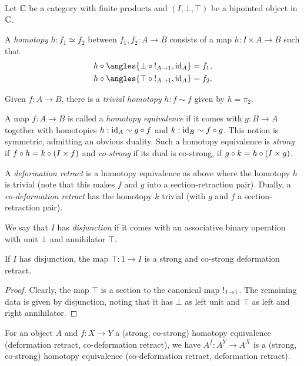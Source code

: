 \documentclass[reqno,10pt,a4paper,oneside]{amsart}
\begin{document}
Let $\mathbb{C}$ be a category with finite products and $(I, \bot, \top)$ be a bipointed object in $\mathbb{C}$.

\begin{definition}
\label{def:homotopy}
A \emph{homotopy} $h : f_1 \simeq f_2$ between $f_1, f_2 : A \to B$ consists of a map $h : I \times A \to B$ such that
\begin{align*}
h \cc \angles{\bot \cc \canonical_{A \to 1}, \id_A} &= f_1
,\\
h \cc \angles{\top \cc \canonical_{A \to 1}, \id_A} &= f_2
.\end{align*}

Given $f : A \to B$, there is a \emph{trivial homotopy} $h : f \sim f$ given by $h = \pi_2$. 
\end{definition}

\begin{definition}
\label{def:homotopy-equivalence}
A map $f : A \to B$ is called a \emph{homotopy equivalence} if it comes with $g : B \to A$ together with homotopies $h : \operatorname{id}_A \sim g \mathbin{\circ} f$ and $k : \operatorname{id}_B \sim f \mathbin{\circ} g$.
This notion is symmetric, admitting an obvious duality.
Such a homotopy equivalence is \emph{strong} if $f \mathbin{\circ} h = k \mathbin{\circ} (I \times f)$ and \emph{co-strong} if its dual is co-strong, \ie if $g \mathbin{\circ} k = h \mathbin{\circ} (I \times g)$.

A \emph{deformation retract} is a homotopy equivalence as above where the homotopy $h$ is trivial (note that this makes $f$ and $g$ into a section-retraction pair).
Dually, a \emph{co-deformation retract} has the homotopy $k$ trivial (with $g$ and $f$ a section-retraction pair).
\end{definition}

We say that $I$ has \emph{disjunction} if it comes with an associative binary operation with unit $\bot$ and annihilator $\top$.

\begin{example}
\label{disjunction-deformation-retract}
If $I$ has disjunction, the map $\top : 1 \to I$ is a strong and co-strong deformation retract.
\end{example}

\begin{proof}
Clearly, the map $\top$ is a section to the canonical map $\mathord{!}_{I \to 1}$.
The remaining data is given by disjunction, noting that it has $\bot$ as left unit and $\top$ as left and right annihilator.
\end{proof}

\begin{remark}
\label{h-equiv-exponent}
For an object $A$ and $f : X \to Y$ a (strong, co-strong) homotopy equivalence (deformation retract, co-deformation retract), we have $A^f : A^Y \to A^X$ is a (strong, co-strong) homotopy equivalence (co-deformation retract, deformation retract).
\end{remark}
\end{document}
